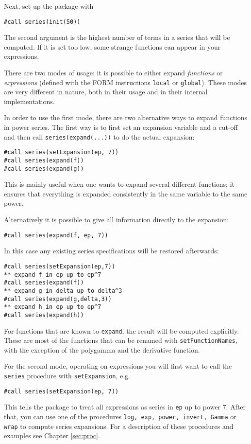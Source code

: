 \documentclass[titlepage]{article}
\begin{document}
Next, set up the package with
\begin{lstlisting}
#call series(init(50))
\end{lstlisting}
The second argument is the highest number of terms in a series that
will be computed. If it is set too low, some strange functions can
appear in your expressions.

There are two modes of usage: it is possible to either expand
\emph{functions} or \emph{expressions} (defined with the FORM
instructions \texttt{local} or \texttt{global}). These modes are very
different in nature, both in their usage and in their internal
implementations.

In order to use the first mode, there are two alternative ways to
expand functions in power series. The first way is to first set an
expansion variable and a cut-off and then call
\lstinline!series(expand(...))! to do the actual expansion:
\begin{lstlisting}
#call series(setExpansion(ep, 7))
#call series(expand(f))
#call series(expand(g))
\end{lstlisting}
This is mainly useful when one wants to expand several different functions; it
ensures that everything is expanded consistently in the same variable to
the same power.

Alternatively it is possible to give all information
directly to the expansion:
\begin{lstlisting}
#call series(expand(f, ep, 7))
\end{lstlisting}
In this case any existing series specifications will be restored
afterwards:
\begin{lstlisting}
#call series(setExpansion(ep,7))
** expand f in ep up to ep^7
#call series(expand(f))
** expand g in delta up to delta^3
#call series(expand(g,delta,3))
** expand h in ep up to ep^7
#call series(expand(h))
\end{lstlisting}

For functions that are known to \lstinline!expand!, the result will
be computed explicitly. These are most of the functions that can be
renamed with \lstinline!setFunctionNames!, with the exception of the
polygamma and the derivative function.

For the second mode, operating on expressions you will first want to
call the \lstinline!series! procedure with \lstinline!setExpansion!, e.g.
\begin{lstlisting}
#call series(setExpansion(ep, 7))
\end{lstlisting}
This tells the package to treat all expressions as series in \texttt{ep} up
to power 7. After that, you can use one of the procedures \lstinline!log, exp, power, invert, Gamma! or \lstinline!wrap! to compute series expansions. For a
description of these procedures and examples see Chapter \ref{sec:proc}.
\end{document}

